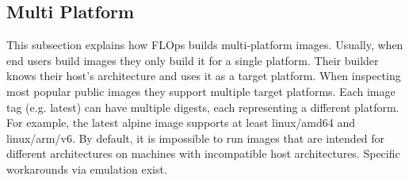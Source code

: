 \subsection{Multi Platform}

This subsection explains how FLOps builds multi-platform images.
Usually, when end users build images they only build it for a single platform.
Their builder knows their host's architecture and uses it as a target platform.
When inspecting most popular public images they support multiple target platforms.
Each image tag (e.g. latest) can have multiple digests, each representing a different platform.
For example, the latest alpine image supports at least linux/amd64 and linux/arm/v6.
By default, it is impossible to run images that are intended for different architectures on machines with incompatible host architectures.
Specific workarounds via emulation exist.

